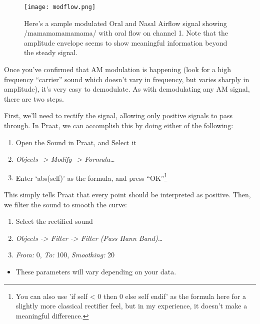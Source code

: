 \documentclass[11pt]{article}
\def\tightlist{}
\begin{document}
\begin{figure}
  \centerline{
    \mbox{\texttt{[image: modflow.png]}}
  }
  \caption{Here's a sample modulated Oral and Nasal Airflow signal showing /mamamamamamama/ with oral flow on channel 1.  Note that the amplitude envelope seems to show meaningful information beyond the steady signal.}
  
  \end{figure}

Once you've confirmed that AM modulation is happening (look for a high
frequency ``carrier'' sound which doesn't vary in frequency, but varies
sharply in amplitude), it's very easy to demodulate. As with
demodulating any AM signal, there are two steps.

First, we'll need to rectify the signal, allowing only positive signals
to pass through. In Praat, we can accomplish this by doing either of the
following:

\begin{enumerate}
\def\labelenumi{\arabic{enumi}.}
\tightlist
\item
  Open the Sound in Praat, and Select it
\item
  \emph{Objects -\textgreater{} Modify -\textgreater{} Formula\ldots{}}
\item
  Enter `abs(self)' as the formula, and press
  ``OK''\footnote{You can also use 'if self < 0 then 0 else self endif' as the formula here for a slightly more classical rectifier feel, but in my experience, it doesn't make a meaningful difference.}
\end{enumerate}

This simply tells Praat that every point should be interpreted as
positive. Then, we filter the sound to smooth the curve:

\begin{enumerate}
\def\labelenumi{\arabic{enumi}.}
\tightlist
\item
  Select the rectified sound
\item
  \emph{Objects -\textgreater{} Filter -\textgreater{} Filter (Pass Hann
  Band)\ldots{}}
\item
  \emph{From:} 0, \emph{To:} 100, \emph{Smoothing:} 20
\end{enumerate}

\begin{itemize}
\tightlist
\item
  These parameters will vary depending on your data.
\end{itemize}
\end{document}
